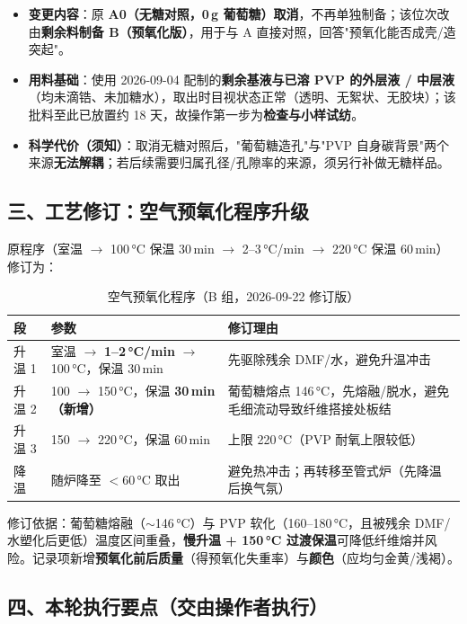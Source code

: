 \begin{itemize}
  \item \textbf{变更内容}：原 \textbf{A0（无糖对照，0\,g 葡萄糖）取消}，不再单独制备；该位次改由\textbf{剩余料制备 B（预氧化版）}，用于与 A 直接对照，回答"预氧化能否成壳/造突起"。
  \item \textbf{用料基础}：使用 2026-09-04 配制的\textbf{剩余基液与已溶 PVP 的外层液 / 中层液}（均未滴锆、未加糖水），取出时目视状态正常（透明、无絮状、无胶块）；该批料至此已放置约 18 天，故操作第一步为\textbf{检查与小样试纺}。
  \item \textbf{科学代价（须知）}：取消无糖对照后，"葡萄糖造孔"与"PVP 自身碳背景"两个来源\textbf{无法解耦}；若后续需要归属孔径/孔隙率的来源，须另行补做无糖样品。
\end{itemize}

\subsection{三、工艺修订：空气预氧化程序升级}

原程序（室温 $\rightarrow$ 100\,°C 保温 30\,min $\rightarrow$ 2--3\,°C/min $\rightarrow$ 220\,°C 保温 60\,min）修订为：

\begin{table}[htbp]
\centering
\caption{空气预氧化程序（B 组，2026-09-22 修订版）}
\begin{tabularx}{\textwidth}{l l X}
\toprule
段 & 参数 & 修订理由 \\
\midrule
升温 1 & 室温 $\rightarrow$ \textbf{1--2\,°C/min} $\rightarrow$ 100\,°C，保温 30\,min & 先驱除残余 DMF/水，避免升温冲击 \\
升温 2 & 100 $\rightarrow$ 150\,°C，保温 \textbf{30\,min（新增）} & 葡萄糖熔点 146\,°C，先熔融/脱水，避免毛细流动导致纤维搭接处板结 \\
升温 3 & 150 $\rightarrow$ 220\,°C，保温 60\,min & 上限 220\,°C（PVP 耐氧上限较低） \\
降温 & 随炉降至 $<$60\,°C 取出 & 避免热冲击；再转移至管式炉（先降温后换气氛） \\
\bottomrule
\end{tabularx}
\end{table}

\noindent 修订依据：葡萄糖熔融（$\sim$146\,°C）与 PVP 软化（160--180\,°C，且被残余 DMF/水塑化后更低）温度区间重叠，\textbf{慢升温 + 150\,°C 过渡保温}可降低纤维熔并风险。记录项新增\textbf{预氧化前后质量}（得预氧化失重率）与\textbf{颜色}（应均匀金黄/浅褐）。

\subsection{四、本轮执行要点（交由操作者执行）}

